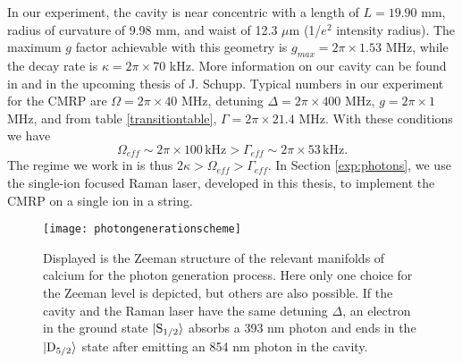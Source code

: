 In our experiment, the cavity is near concentric with a length of $L = 19.90$ mm, radius of curvature of 9.98 mm, and waist of 12.3 $\mu$m (1/$e^2$ intensity radius). The maximum $g$ factor achievable with this geometry is $g_{max} = 2\pi \times 1.53$ MHz, while the decay rate is $\kappa = 2\pi\times 70$ kHz. More information on our cavity can be found in \cite{Krutyanskiy2019} and in the upcoming thesis of J. Schupp. Typical numbers in our experiment for the CMRP are $\Omega =  2\pi\times 40$ MHz, detuning $\Delta = 2\pi\times 400$ MHz, $g = 2\pi\times 1$ MHz, and from table \ref{transitiontable}, $\Gamma = 2\pi \times 21.4$ MHz. With these conditions we have
\[\Omega_{eff} \sim 2\pi\times 100\, \text{kHz} > \Gamma_{eff} \sim 2\pi\times 53\,\text{kHz}.\]
The regime we work in is thus $2\kappa>\Omega_{eff}>\Gamma_{eff}$. In Section \ref{exp:photons}, we use the single-ion focused Raman laser, developed in this thesis, to implement the CMRP on a single ion in a string.
\begin{figure}
     \centering
     \texttt{[image: photongenerationscheme]}
    \caption{Displayed is the Zeeman structure of the relevant manifolds of calcium for the photon generation process. Here only one choice for the Zeeman level is depicted, but others are also possible. If the cavity and the Raman laser have the same detuning $\Delta$, an electron in the ground state $\ket{\text{S}_{1/2}}$ absorbs a 393 nm photon and ends in the $\ket{\text{D}_{5/2}}$ state after emitting an 854 nm photon in the cavity.}
      \label{ramanprocess}
\end{figure}




